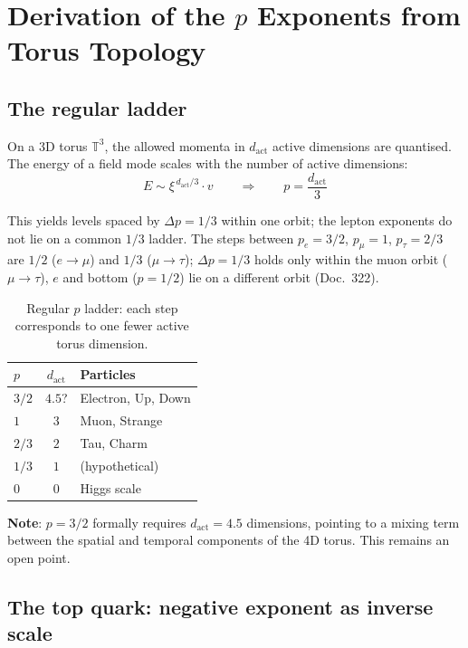 \section{Derivation of the \texorpdfstring{$p$}{p} Exponents from Torus Topology}

\subsection{The regular ladder}

On a 3D torus $\mathbb{T}^3$, the allowed momenta in $d_{\text{act}}$
active dimensions are quantised. The energy of a field mode scales
with the number of active dimensions:
\begin{equation}
    E \sim \xi^{\,d_{\text{act}}/3} \cdot v
    \qquad \Rightarrow \qquad
    p = \frac{d_{\text{act}}}{3}
\end{equation}

This yields levels spaced by $\Delta p = 1/3$ within one orbit; the lepton
exponents do not lie on a common $1/3$ ladder. The steps between
$p_e = 3/2$, $p_\mu = 1$, $p_\tau = 2/3$ are $1/2$ ($e\to\mu$) and $1/3$
($\mu\to\tau$); $\Delta p = 1/3$ holds only within the muon orbit
($\mu \to \tau$), $e$ and bottom ($p = 1/2$) lie on a different orbit
(Doc.~322).

\begin{table}[htbp]
\centering
\begin{tabular}{lcl}
\toprule
$p$ & $d_{\text{act}}$ & \textbf{Particles} \\
\midrule
$3/2$ & $4.5$? & Electron, Up, Down \\
$1$   & $3$    & Muon, Strange \\
$2/3$ & $2$    & Tau, Charm \\
$1/3$ & $1$    & (hypothetical) \\
$0$   & $0$    & Higgs scale \\
\bottomrule
\end{tabular}
\caption{Regular $p$ ladder: each step corresponds to one fewer active
torus dimension.}
\label{tab:p_ladder}
\end{table}

\textbf{Note}: $p = 3/2$ formally requires $d_{\text{act}} = 4.5$
dimensions, pointing to a mixing term between the spatial and temporal
components of the 4D torus. This remains an open point.

\subsection{The top quark: negative exponent as inverse scale}

